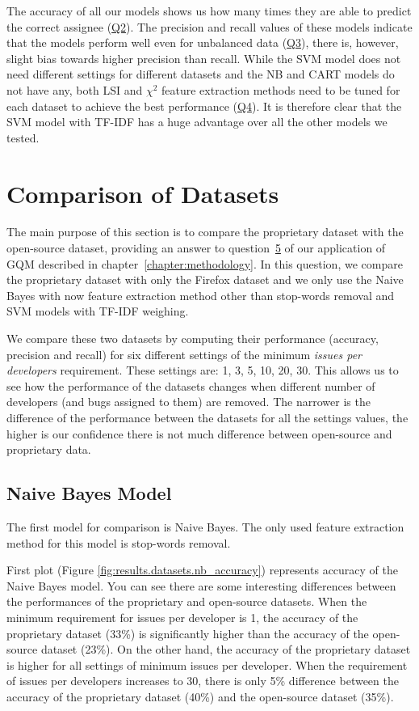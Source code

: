 The accuracy of all our models shows us how many times they are able to predict the correct assignee (\hyperlink{question:2}{Q2}). The precision and recall values of these models indicate that the models perform well even for unbalanced data (\hyperlink{question:3}{Q3}), there is, however, slight bias towards higher precision than recall. While the SVM model does not need different settings for different datasets and the NB and CART models do not have any, both LSI and $\chi^2$ feature extraction methods need to be tuned for each dataset to achieve the best performance (\hyperlink{question:4}{Q4}). It is therefore clear that the SVM model with TF-IDF has a huge advantage over all the other models we tested.

\section{Comparison of Datasets}
\label{section:comparison-of-datasets}

The main purpose of this section is to compare the proprietary dataset with the open-source dataset, providing an answer to question~\hyperlink{question:5}{5} of our application of GQM described in chapter~\ref{chapter:methodology}. In this question, we compare the proprietary dataset with only the Firefox dataset and we only use the Naive Bayes with now feature extraction method other than stop-words removal and SVM models with TF-IDF weighing.

We compare these two datasets by computing their performance (accuracy, precision and recall) for six different settings of the minimum \textit{issues per developers} requirement. These settings are: 1, 3, 5, 10, 20, 30. This allows us to see how the performance of the datasets changes when different number of developers (and bugs assigned to them) are removed. The narrower is the difference of the performance between the datasets for all the settings values, the higher is our confidence there is not much difference between open-source and proprietary data.

\subsection{Naive Bayes Model}

The first model for comparison is Naive Bayes. The only used feature extraction method for this model is stop-words removal.

First plot (Figure \ref{fig:results.datasets.nb_accuracy}) represents accuracy of the Naive Bayes model. You can see there are some interesting differences between the performances of the proprietary and open-source datasets. When the minimum requirement for issues per developer is 1, the accuracy of the proprietary dataset (33\%) is significantly higher than the accuracy of the open-source dataset (23\%). On the other hand, the accuracy of the proprietary dataset is higher for all settings of minimum issues per developer. When the requirement of issues per developers increases to 30, there is only 5\% difference between the accuracy of the proprietary dataset (40\%) and the open-source dataset (35\%).

